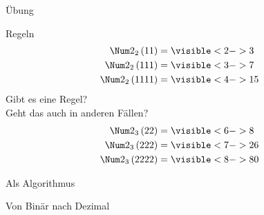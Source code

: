 \begin{frame}{Übung}
    \begin{exampleblock}{Regeln}
        \begin{align*}
            \Num2_2\left( 11 \right) &= \visible<2->{3}\\
            \Num2_2\left( 111 \right) &= \visible<3->{7}\\
            \Num2_2\left( 1111 \right) &= \visible<4->{15}
        \end{align*}
        Gibt es eine Regel? \\
        Geht das auch in anderen Fällen?
        \begin{align*}
            \Num2_3\left( 22 \right) &= \visible<6->{8}\\
            \Num2_3\left( 222 \right) &= \visible<7->{26}\\
            \Num2_3\left( 2222 \right) &= \visible<8->{80}
        \end{align*}
    \end{exampleblock}
\end{frame}
\begin{frame}{Als Algorithmus}
    \begin{exampleblock}{Von Binär nach Dezimal}
    \end{exampleblock}
\end{frame}
